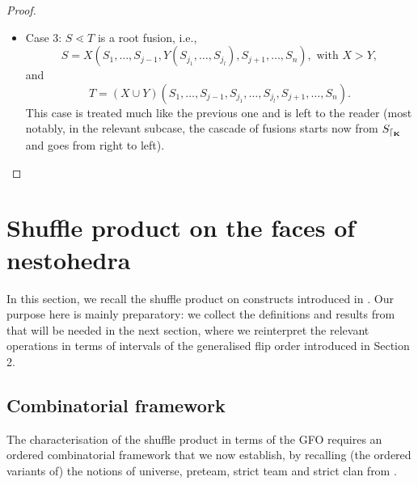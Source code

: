 \documentclass{article}
\theoremstyle{plain}
\theoremstyle{definition}
\newcommand{\restrconstr}[2]{{#1}_{\lceil_{#2}}}
\begin{document}
\begin{proof}
\begin{itemize}
\begin{itemize}
\end{itemize}
\item Case 3: $S\lessdot T$ is a root fusion, i.e., 
$$S=X(S_1,\ldots, S_{j-1},Y(S_{j_1},\ldots, S_{j_l}),S_{j+1},\ldots,S_n), \mbox{ with } X>Y,$$ and
$$T=(X\cup Y)(S_1,\ldots, S_{j-1},S_{j_1},\ldots, S_{j_l},S_{j+1},\ldots,S_n).$$ This case is treated much like the previous one and is left to the reader (most notably, in the relevant subcase, the cascade of fusions starts now from $\restrconstr{S}{{\bf K}}$ and goes from right to left).
\end{itemize}
\end{proof}



\section{Shuffle product on the faces of nestohedra} \label{strict-reminders-section}
In this section, we recall the shuffle product on constructs introduced in \cite{PLBJ1}. Our purpose here is mainly preparatory: we collect the definitions and results from \cite{PLBJ1} that will be needed in the next section, where we reinterpret the relevant operations in terms of intervals of the generalised flip order introduced in Section 2. 

 
 

\subsection{Combinatorial framework}

The characterisation of the shuffle product in terms of the GFO requires an ordered combinatorial framework that we now establish, by recalling (the ordered variants of) the notions of universe, preteam,
strict team and strict clan from \cite{PLBJ1}. 

\smallskip
\end{document}
